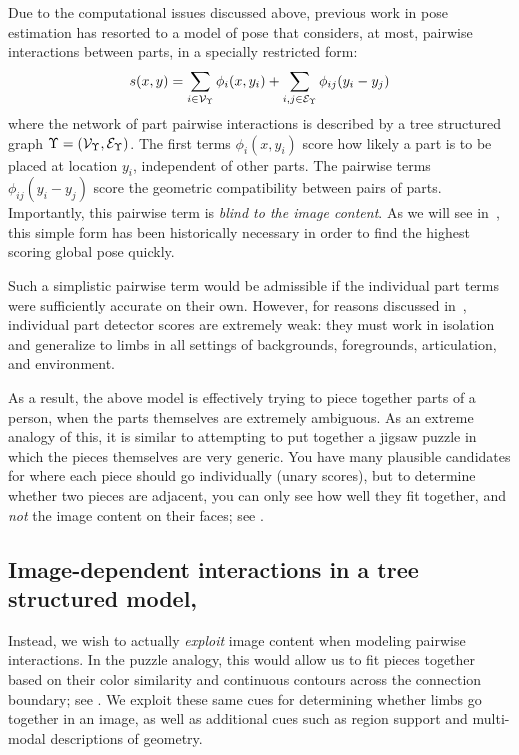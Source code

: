Due to the computational issues discussed above, previous work in pose 
estimation has resorted to a model of pose that considers, at most, pairwise 
interactions between parts, in a specially restricted form:
$$ s(x,y) =  \sum_{i \in \mathcal{V}_{\Upsilon}} \phi_i(x,y_i) + \sum_{i,j \in 
\mathcal{E}_{\Upsilon}} \phi_{ij}(y_i - y_j) $$
where the network of part pairwise interactions is described by a tree 
structured graph $\Upsilon = (\mathcal{V}_\Upsilon,\mathcal{E}_\Upsilon)$.  The first terms 
$\phi_i(x,y_i)$ score how likely a part is to be placed at location $y_i$, 
independent of other parts.  The pairwise terms $\phi_{ij}(y_i-y_j)$ score the 
geometric compatibility between pairs of parts.  Importantly, this pairwise 
term is {\em blind to the image content}.  As we will see in~, this 
simple form has been historically necessary in order to find the highest 
scoring global pose quickly.

Such a simplistic pairwise term would be admissible if the individual part 
terms were sufficiently accurate on their own.  However, for reasons discussed 
in~, individual part detector scores are extremely weak: 
they must work in isolation and generalize to limbs in all settings of 
backgrounds, foregrounds, articulation, and environment.

As a result, the above model is effectively trying to piece together parts of a 
person, when the parts themselves are extremely ambiguous. As an extreme 
analogy of this, it is similar to attempting to put together a jigsaw puzzle in 
which the pieces themselves are very generic.  You have many plausible 
candidates for where each piece should go individually (unary scores), but to 
determine whether two pieces are adjacent, you can only see how well they fit 
together, and {\em not } the  image content on their faces; see 
.


\subsection{Image-dependent interactions in a tree structured 
model,~}
\label{sec:contrib1}
Instead, we wish to actually {\em exploit } image content when modeling 
pairwise interactions.  In the puzzle analogy, this would allow us to fit 
pieces together based on their color similarity and continuous contours across 
the connection boundary; see .  We exploit these 
same cues for determining whether limbs go together in an image, as well as 
additional cues such as region support and multi-modal descriptions of 
geometry.


